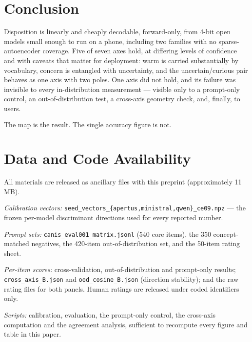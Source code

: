 \documentclass[11pt]{article}
\begin{document}
\section{Conclusion}

Disposition is linearly and cheaply decodable, forward-only, from 4-bit open models small enough
to run on a phone, including two families with no sparse-autoencoder coverage. Five of seven axes
hold, at differing levels of confidence and with caveats that matter for deployment: warm is
carried substantially by vocabulary, concern is entangled with uncertainty, and the
uncertain/curious pair behaves as one axis with two poles. One axis did not hold, and its failure
was invisible to every in-distribution measurement --- visible only to a prompt-only control, an
out-of-distribution test, a cross-axis geometry check, and, finally, to users.

The map is the result. The single accuracy figure is not.

\section*{Data and Code Availability}

All materials are released as ancillary files with this preprint (approximately 11\,MB).

\emph{Calibration vectors:} \texttt{seed\_vectors\_\{apertus,ministral,qwen\}\_ce09.npz} --- the
frozen per-model discriminant directions used for every reported number.

\emph{Prompt sets:} \texttt{canis\_eval001\_matrix.jsonl} (540 core items), the 350 concept-matched
negatives, the 420-item out-of-distribution set, and the 50-item rating sheet.

\emph{Per-item scores:} cross-validation, out-of-distribution and prompt-only results;
\texttt{cross\_axis\_B.json} and \texttt{ood\_cosine\_B.json} (direction stability); and the raw
rating files for both panels. Human ratings are released under coded identifiers only.

\emph{Scripts:} calibration, evaluation, the prompt-only control, the cross-axis computation and
the agreement analysis, sufficient to recompute every figure and table in this paper.



\end{document}
